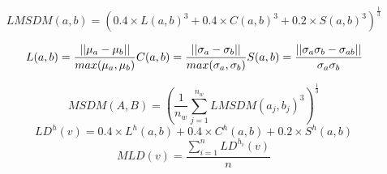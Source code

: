 
\begin{equation}
LMSDM(a,b) = (0.4\times L(a,b)^3+0.4\times C(a,b)^3+0.2\times S(a,b)^3)^{\frac{1}{3}}
\end{equation}

\begin{equation}
 L(a,b) = \frac{||\mu_a-\mu_b||}{max(\mu_a, \mu_b)}\\
 C(a,b) = \frac{||\sigma_a-\sigma_b||}{max(\sigma_a, \sigma_b)}\\
 S(a,b) = \frac{||\sigma_a\sigma_b -\sigma_{ab}||}{\sigma_a\sigma_b}
\end{equation}

\begin{equation}
MSDM(A,B) = (\frac{1}{n_w} \sum_{j=1}^{n_w}{LMSDM(a_j,b_j)^3})^{\frac{1}{3}}
\end{equation}
\begin{equation}
LD^h(v) = 0.4\times L^h(a,b)+0.4\times C^h(a,b)+0.2\times S^h(a,b)
\end{equation}
\begin{equation}
MLD(v) = \frac{\sum_{i=1}^n{LD^{h_i}(v)}}{n}
\end{equation}